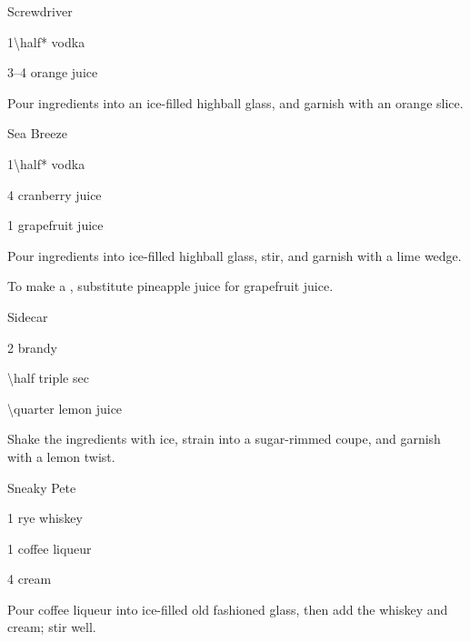 \begin{Cocktail}{Screwdriver}
	\begin{Ingredients}
	\item \SI{1\half*}{\oz} vodka
	\item \SIrange{3}{4}{\oz} orange juice
	\end{Ingredients}
	
	\begin{Instructions}
	Pour ingredients into an ice-filled highball glass, and garnish with an orange slice.
	\end{Instructions}
\end{Cocktail}

\begin{Cocktail}{Sea Breeze}
	\begin{Ingredients}
	\item \SI{1\half*}{\oz} vodka
	\item \SI{4}{\oz} cranberry juice
	\item \SI{1}{\oz} grapefruit juice
	\end{Ingredients}
	
	\begin{Instructions}
	Pour ingredients into ice-filled highball glass, stir, and garnish with a lime wedge.
	
	To make a , substitute pineapple juice for grapefruit juice.
	\end{Instructions}
\end{Cocktail}

\begin{Cocktail}{Sidecar}
	\begin{Ingredients}
	\item \SI{2}{\oz} brandy
	\item \SI{\half}{\oz} triple sec
	\item \SI{\quarter}{\oz} lemon juice
	\end{Ingredients}
	
	\begin{Instructions}
	Shake the ingredients with ice, strain into a sugar-rimmed coupe, and garnish with a lemon twist.
	\end{Instructions}
\end{Cocktail}

\begin{Cocktail}{Sneaky Pete}
	\begin{Ingredients}
	\item \SI{1}{\oz} rye whiskey
	\item \SI{1}{\oz} coffee liqueur
	\item \SI{4}{\oz} cream
	\end{Ingredients}
	
	\begin{Instructions}
	Pour coffee liqueur into ice-filled old fashioned glass, then add the whiskey and cream; stir well.
	\end{Instructions}
\end{Cocktail}

